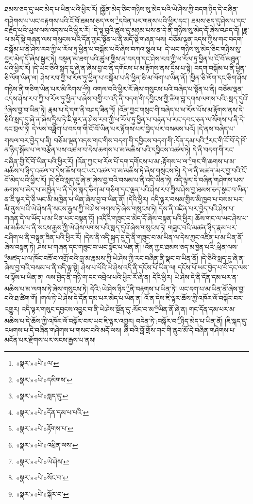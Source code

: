 ཐམས་ཅད་དུ་ཡང་མེད་པ་ཡིན་པའི་ཕྱིར་རོ། །སྐྱོན་མེད་ཅིང་གཉིས་སུ་མེད་པའི་ཡེ་ཤེས་ཀྱི་བདག་ཉིད་དེ་བཞིན་གཤེགས་པ་ཡང་བརྟགས་པའི་ངོ་བོ་ཐམས་ཅད་ལས་\footnote{«སྣར་»«པེ་»ལ་}དབེན་པར་གནས་པའི་ཕྱིར་དང་། ཐམས་ཅད་དུ་ཤེས་པ་དང་བརྗོད་པའི་ཡུལ་ལས་འདས་པའི་ཕྱིར་རོ། །དེ་ལྟ་བུའི་ཚུལ་དུ་མཉམ་པས་ན་དེ་ནི་གཉིས་སུ་མེད་དོ་ཞེས་བཤད་དོ། །ཟླ་ལ་མདོ་སྡེ་གཞན་ལས་གསུངས་པའི་དོན་ཀྱང་སྟོན་པ་ནི་མདོ་སྡེ་གཞན་ལས། བཅོམ་ལྡན་འདས་ཀྱིས་གང་བདག་བསྒོམ་པ་ནི་ཤེས་རབ་ཀྱི་ཕ་རོལ་ཏུ་ཕྱིན་པ་བསྒོམ་པའོ་ཞེས་བཀའ་སྩལ་པ། དེ་ཡང་གཉིས་སུ་མེད་ཅིང་གཉིས་སུ་བྱར་མེད་དོ་ཞེས་སྦྱར་ཏེ། བསྟན་མ་ཐག་པའི་ཚུལ་གྱིས་ན་བདག་དང་ཤེས་རབ་ཀྱི་ཕ་རོལ་ཏུ་ཕྱིན་པ་ངོ་བོ་མཐུན་པའི་ཕྱིར་རོ། །དེ་ཡང་ཅིའི་སླད་དུ་ཞེ་ན་ཞེས་བྱ་བ་ནི་དགོངས་པ་མ་རྟོགས་ནས་དྲིས་པ་སྟེ། བདག་བསྒོམ་པ་ནི་ཕྱིན་ཅི་ལོག་ཡིན་ལ། ཤེས་རབ་ཀྱི་ཕ་རོལ་ཏུ་ཕྱིན་པ་བསྒོམ་པ་ནི་ཕྱིན་ཅི་མ་ལོག་པ་ཡིན་ནོ། །ཕྱིན་ཅི་ལོག་དང་ཅིག་ཤོས་གཉིས་ནི་གཅིག་ཡིན་པར་མི་རིགས་\footnote{«སྣར་»«པེ་»དམིགས་}ཏེ། འགལ་བའི་ཕྱིར་རོ་ཞེས་གསུངས་པའི་བཞེད་པ་སྟོན་པ་ནི། བཅོམ་ལྡན་འདས་ཤེས་རབ་ཀྱི་ཕ་རོལ་ཏུ་ཕྱིན་པ་ཞེས་བགྱི་བ་འདི་ནི་བདག་གི་དབྱིངས་ཀྱི་ཚིག་བླ་དགས་ལགས་པའི་:སླད་དུའོ་\footnote{«སྣར་»«པེ་»སླད་དུ་}ཞེས་བྱ་བ་ཡིན་ཏེ། རྣམ་པ་དེ་དག་ནི་བཤད་ཟིན་ཏོ། །འོན་ཀྱང་གསུང་གི་བཞེད་པ་ཕ་རོལ་པོས་མ་རྟོགས་ནས་དེ་ཅིའི་སླད་དུ་ཞེ་ན་ཞེས་དྲིས་ཏེ་ཇི་ལྟར་ན་ཤེས་རབ་ཀྱི་ཕ་རོལ་ཏུ་ཕྱིན་པ་བརྟན་པ་རང་དབང་ཅན་ལ་སོགས་པ་ནི་དེ་དང་བྲལ་ཏེ། དེ་ལས་བཟློག་པ་བདག་གི་ངོ་བོ་ཡིན་པར་རྟོགས་པར་བྱེད་པར་བསམས་པའོ། །དེ་ནས་བཞེད་པ་གསལ་བར་བྱེད་པ་ནི། བཅོམ་ལྡན་འདས་གང་གིས་བདག་གི་དབྱིངས་བདག་གི་:དོན་དམ་པའི་\footnote{«སྣར་»«པེ་»དོན་དམ་པ་པའི་}རང་གི་ངོ་བོ་དེ་ཁོ་ན་ཉིད་སྒོམ་པ་ལ་བརྩོན་པས་འཚལ་བ་དེས་ཆགས་པ་མ་མཆིས་པའི་དབྱིངས་འཚལ་ཏེ། དེ་ནི་བདག་གི་རང་བཞིན་གྱི་ངོ་བོ་ཡིན་པའི་ཕྱིར་རོ། །འོན་ཀྱང་ཕ་རོལ་པོ་དག་དགོངས་པ་མ་:རྟོགས་པ་ལ་\footnote{«སྣར་»«པེ་»རྟོགས་པ་}གང་གི་ཆགས་པ་མ་མཆིས་པ་ཉིད་འཚལ་བ་དེས་ཆོས་གང་ཡང་འཚལ་བ་མ་མཆིས་ཏེ་ཞེས་གསུངས་ཏེ། དེ་ལ་ནི་མཚན་མར་བྱ་བའི་ངོ་བོ་མེད་པའི་ཕྱིར་རོ། །དེ་ཅིའི་སླད་དུ་ཞེ་ན་ཞེས་བྱ་བའི་བསམ་པ་ནི་འདི་ཡིན་ཏེ། འདི་ལྟར་དེ་བཞིན་གཤེགས་པས་ཆགས་པ་མེད་པ་མཁྱེན་པ་ནི་དེས་སྐད་ཅིག་མ་གཅིག་དང་ལྡན་པའི་ཤེས་རབ་ཀྱིས་ཤེས་བྱ་ཐམས་ཅད་སྣང་བ་ཡིན་ན་ཇི་ལྟར་དེ་ཅི་ཡང་མི་མཁྱེན་པ་ཡིན་ཞེས་བྱ་བ་ཡིན་ནོ། །དེའི་ཕྱིར། འདི་ལྟར་བསམ་གྱིས་མི་ཁྱབ་པ་བསམ་པར་མི་ནུས་པའི་ཡེ་ཤེས་ནི་སངས་རྒྱས་ཀྱི་ཡེ་ཤེས་ལགས་ཏེ་ཞེས་གསུངས་ཏེ། དེས་ནི་འཛིན་པར་བྱེད་པའི་ཤེས་པ་གཞན་དེ་ལ་ཡོད་པ་མ་ཡིན་པར་བསྟན་ཏོ། །འདིའི་གཟུང་བ་མེད་དོ་ཞེས་བསྟན་པའི་ཕྱིར། ཆོས་གང་ལ་ཡང་ཤེས་པ་མ་མཆིས་པ་ནི་སངས་རྒྱས་ཀྱི་ཡེ་ཤེས་ལགས་པའི་སླད་དུའོ་ཞེས་གསུངས་ཏེ། གཟུང་བའི་མཚན་ཉིད་རྣམ་པར་བཤིག་པ་ནི་བསྟན་ཟིན་པའི་ཕྱིར་རོ། །དེས་ནི་འདི་སྐད་དུ་དེ་ནི་གཟུང་བ་མ་ཡིན་ལ་དེས་ཀྱང་འཛིན་པ་མ་ཡིན་ནོ་ཞེས་བསྟན་ཏེ། ཤེས་པ་གཞན་དང་གཟུང་བ་ཡང་སྟོང་པ་ཡིན་ནོ། །འོན་ཀྱང་ཐམས་ཅད་མཁྱེན་པའི་:ཕྲིན་ལས་\footnote{«སྣར་»«པེ་»འཕྲིན་ལས་}མཛད་པ་ལ་ཁོང་བཟོ་བ་འགྲོ་བའི་བླ་མ་རྣམས་ཀྱི་ཡེ་ཤེས་ཀྱི་རང་བཞིན་ནི་སྣང་བ་ཡིན་ནོ། །དེ་ཅིའི་སླད་དུ་ཞེ་ན་ཞེས་བྱ་བའི་བསམ་པ་ནི་འདི་ལྟ་སྟེ། ཤེས་པ་པོའི་ཡེ་ཤེས་འདི་ནི་དངོས་པོ་ཡིན་ལ། དངོས་པོ་ཡང་བྱེད་པ་པོ་དང་ལས་ལ་ལྟོས་པ་ཡིན་ན། ལས་བྱེད་ནི་གཉི་ག་དང་འབྲེལ་པའི་ཕྱིར་རོ་ཞེ་ན། དེའི་ཕྱིར། ཡེ་ཤེས་དེ་ནི་དོན་དམ་པར་ན་མཆིས་པ་མ་ལགས་ཏེ་ཞེས་གསུངས་ཏེ། དེའི་:ཡེ་ཤེས་ཉིད་\footnote{«སྣར་»«པེ་»ཡེ་ཤེས་}ནི་བརྟགས་པ་ཡིན་ཏེ། ཡང་དག་པ་མ་ཡིན་ནོ་ཞེས་བྱ་བའི་ཐ་ཚིག་གོ། །གལ་ཏེ་ཡེ་ཤེས་དེ་དོན་དམ་པར་མེད་པ་ཡིན་ན། འོ་ན་དེས་ཇི་ལྟར་ཆོས་ཀྱི་འཁོར་ལོ་བསྐོར་བར་འགྱུར། འདི་ལྟར་གསུང་དབྱངས་འབྱུང་བ་ནི་ཡེ་ཤེས་སྔོན་དུ་:སོང་བ་མ་\footnote{«སྣར་»«པེ་»སོང་བ་}ཡིན་ནོ་ཞེ་ན། གང་དོན་དམ་པར་མ་མཆིས་པ་དེ་ཆོས་ཀྱི་འཁོར་ལོ་བསྐོར་བར་ཡང་ཇི་ལྟར་འགྱུར། བདེན་ཏེ་:བསྐོར་བ་\footnote{«སྣར་»«པེ་»སྐོར་བ་}ཉིད་མེད་པ་ཡིན་ནོ། །ཇི་སྐད་དུ་འཕགས་པ་དེ་བཞིན་གཤེགས་པ་གསང་བའི་མདོ་ལས། ཞི་བའི་བློ་གྲོས་གང་གི་ནུབ་མོ་དེ་བཞིན་གཤེགས་པ་མངོན་པར་རྫོགས་པར་སངས་རྒྱས་པ་ནས། 